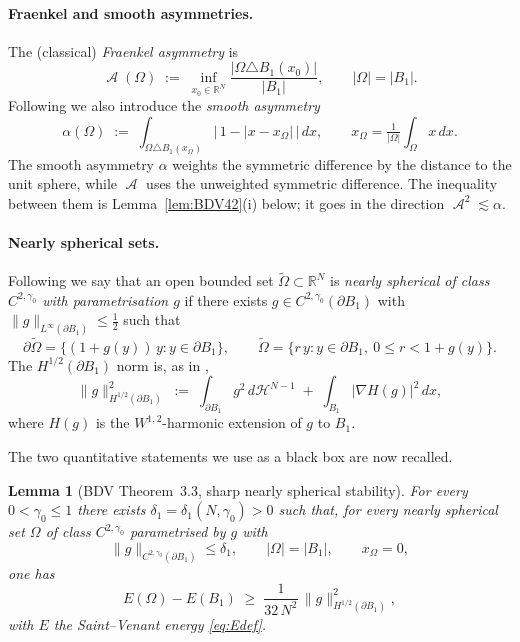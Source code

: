 \documentclass[11pt]{article}
\newtheorem{lemma}[theorem]{Lemma}
\theoremstyle{definition}
\DeclareMathOperator{\Asym}{\mathcal{A}}
\newcommand{\bdy}{\partial}
\newcommand{\Rn}{\mathbb{R}^N}
\newcommand{\Ot}{\widetilde{\Omega}}
\newcommand{\HN}{\mathcal{H}^{N-1}}
\begin{document}
\paragraph{Fraenkel and smooth asymmetries.}
The (classical) \emph{Fraenkel asymmetry} is
\[
\Asym(\Omega)\;:=\;\inf_{x_0\in\Rn}
\frac{|\Omega\triangle B_1(x_0)|}{|B_1|},
\qquad |\Omega|=|B_1|.
\]
Following \cite[Definition~4.1]{BDV2013} we also introduce the
\emph{smooth asymmetry}
\begin{equation}\label{eq:alphadef}
\alpha(\Omega)\;:=\;\int_{\Omega\triangle B_1(x_\Omega)}
\bigl|\,1-|x-x_\Omega|\,\bigr|\,dx,
\qquad x_\Omega=\tfrac1{|\Omega|}\!\int_\Omega x\,dx.
\end{equation}
The smooth asymmetry $\alpha$ weights the symmetric difference by the
distance to the unit sphere, while $\Asym$ uses the unweighted symmetric
difference. The inequality between them is Lemma~\ref{lem:BDV42}(i)
below; it goes in the direction $\Asym^{2}\lesssim\alpha$.

\paragraph{Nearly spherical sets.}
Following \cite[Definition~3.1]{BDV2013} we say that an open bounded set
$\Ot\subset\Rn$ is \emph{nearly spherical of class $C^{2,\gamma_0}$ with
parametrisation $g$} if there exists $g\in C^{2,\gamma_0}(\bdy B_1)$
with $\|g\|_{L^\infty(\bdy B_1)}\le \tfrac12$ such that
\[
\bdy\Ot=\bigl\{(1+g(y))\,y:y\in\bdy B_1\bigr\},\qquad
\Ot=\bigl\{r\,y:y\in\bdy B_1,\ 0\le r<1+g(y)\bigr\}.
\]
The $H^{1/2}(\bdy B_1)$ norm is, as in \cite[Definition~3.2]{BDV2013},
\[
\|g\|_{H^{1/2}(\bdy B_1)}^2
\;:=\;\int_{\bdy B_1}g^2\,d\HN
\;+\;\int_{B_1}|\nabla H(g)|^2\,dx,
\]
where $H(g)$ is the $W^{1,2}$-harmonic extension of $g$ to $B_1$.

\medskip
The two quantitative statements we use as a black box are now recalled.

\begin{lemma}[BDV Theorem~3.3, sharp nearly spherical stability]
\label{lem:BDV33}
For every $0<\gamma_0\le 1$ there exists $\delta_1=\delta_1(N,\gamma_0)>0$
such that, for every nearly spherical set $\Omega$ of class
$C^{2,\gamma_0}$ parametrised by $g$ with
\[
\|g\|_{C^{2,\gamma_0}(\bdy B_1)}\le\delta_1,\qquad
|\Omega|=|B_1|,\qquad x_\Omega=0,
\]
one has
\begin{equation}\label{eq:BDV33}
E(\Omega)-E(B_1)\;\ge\;\frac{1}{32\,N^2}\,\|g\|_{H^{1/2}(\bdy B_1)}^2,
\end{equation}
with $E$ the Saint--Venant energy \eqref{eq:Edef}.
\end{lemma}
\end{document}
